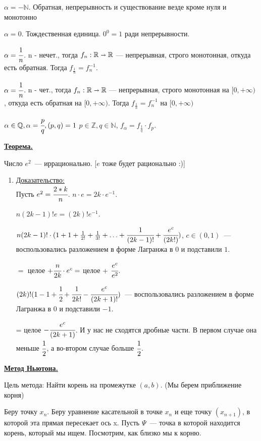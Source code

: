 \documentclass{article}
\newcommand{\deff}[1]{\underline{\textbf{#1}}}
\newcommand{\thmm}[1]{\underline{\textbf{#1}}}
\newcommand{\prooff}[1]{{\underline{Доказательство:}} \\ }
\begin{document}
$\alpha = -\mathbb{N}$. Обратная, непрерывность и существование везде кроме нуля и монотонно

$\alpha = 0$. Тождественная единица. $0^0 = 1$ ради непрерывности.

$\alpha = \cfrac{1}{n}$. n - нечет., тогда $f_n: \mathbb{R} \shortrightarrow \mathbb{R}$ --- непрерывная, строго монотонная, откуда есть обратная. Тогда  $f_{\frac{1}{n}}=f_n^{-1}$.

$\alpha = \cfrac{1}{n}$. n - чет., тогда $f_n: \mathbb{R} \shortrightarrow \mathbb{R}$ --- непрерывная, строго монотонная на $[0, +\infty)$ , откуда есть обратная на $[0, +\infty)$. Тогда  $f_{\frac{1}{n}}=f_n^{-1}$ на $[0, +\infty)$

$\alpha \in \mathbb{Q}, \alpha  = \cfrac{p}{q}, (p,q) =1$ $p \in \mathbb{Z}, q \in \mathbb{N}$, $f_\alpha = f_\frac{1}{q} \cdot f_p$.

\thmm{Теорема.} 

Число $e^2$~--- иррационально. [$e$ тоже будет рационально :)]

\begin{enumerate}
    \item[] \prooff{}
    Пусть $e^2 = \cfrac{2*k}{n}$. $n \cdot e = 2k \cdot e^{-1}$.

    $n(2k-1)! e = (2k)! e^{-1}$.

    $n(2k-1)! \cdot (1 + 1 + \frac{1}{2!} + \frac{1}{3!} + \ldots +\cfrac{1}{(2k-1)!}+ \cfrac{e^c}{(2k!)})$, $c \in (0,1)$~--- воспользовались разложением в форме Лагранжа в $0$ и подставили $1$.

    $=$ целое $+ \cfrac{n}{2k}\cdot e^c = $ целое + $\cfrac{e^c}{e^2}$.

    $(2k)! (1 - 1 + \cfrac{1}{2} + \cfrac{1}{2k!} - \cfrac{e^c}{(2k+1)!})$~--- воспользовались разложением в форме Лагранжа в $0$ и подставили $-1$.
    
    = целое $- \cfrac{e^c}{(2k+1)}$. И у нас не сходятся дробные части. В первом случае она меньше $\cfrac{1}{2}$, а во-втором случае больше $\cfrac{1}{2}$.
\end{enumerate}


 \deff{Метод Ньютона.}

Цель метода: Найти корень на промежутке $(a,b)$. (Мы берем приближение корня) 


 Беру точку $x_n$. Беру уравнение касательной в точке $x_n$ и еще точку $(x_{n+1})$, в которой эта прямая пересекает ось x. Пусть $\Psi$~--- точка  в которой находится корень, который мы ищем. Посмотрим, как близко мы к корню.
\end{document}
